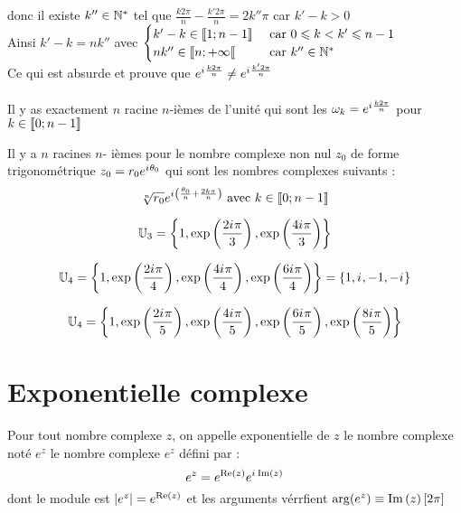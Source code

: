 \begin{dem}
    donc il existe \(k'' \in \mathbb{N}^*\) tel que \(\frac{k2\pi}{n} -\frac{k'2\pi}{n} = 2 k'' \pi\) car \(k'-k >0\)\\
    Ainsi \(k'-k = nk''\) avec \(\begin{cases}
        k'-k \in \left\llbracket1;n-1\right\rrbracket &\text{ car } 0\leqslant k<k'\leqslant n-1 \\
        nk'' \in \left\llbracket n;+\infty\right\llbracket & \text{ car } k''\in \mathbb{N}^*
    \end{cases}\) \\
    Ce qui est absurde et prouve que \(e^{i\mkern1mu \frac{k2\pi}{n}} \neq e^{i\mkern1mu \frac{k'2\pi}{n}}\)\\
    \conclusion \\
    Il y as exactement \(n\) racine \(n\)-ièmes de l'unité qui sont les \( \omega_k = e^{i\mkern1mu \frac{k2\pi}{n}}\) pour \(k\in \left\llbracket0;n-1\right\rrbracket\)
\end{dem}


\begin{defprop}
    Il y a \(n\) racines \(n\)- ièmes pour le nombre complexe non nul \(z_0\) de forme trigonométrique \(z_0 = r_0e^{i\mkern1mu\theta_0}\) qui sont les nombres complexes suivants :
    \[\sqrt[n]{r_0}e^{i\mkern1mu \left(\frac{\theta_0}{n}+\frac{2k\pi}{n}\right)} \text{ avec }k \in \left\llbracket0;n-1\right\rrbracket\]
\end{defprop}

\begin{ex}
\[\mathbb{U}_3 = \left\lbrace1,\exp\left(\frac{2i\mkern1mu \pi}{3}\right),\exp \left(\frac{4 i\mkern1mu \pi}{3}\right)\right\rbrace\]

\[\mathbb{U}_4 = \left\lbrace1,\exp\left(\frac{2i\mkern1mu \pi}{4}\right),\exp \left(\frac{4 i\mkern1mu \pi}{4}\right),\exp \left(\frac{6 i\mkern1mu \pi}{4}\right)\right\rbrace = \left\lbrace1,i\mkern1mu,-1,-i\mkern1mu\right\rbrace\]

\[\mathbb{U}_4 = \left\lbrace1,\exp\left(\frac{2i\mkern1mu \pi}{5}\right),\exp \left(\frac{4 i\mkern1mu \pi}{5}\right),\exp \left(\frac{6 i\mkern1mu \pi}{5}\right),\exp \left(\frac{8i\mkern1mu \pi}{5}\right)\right\rbrace \]

\end{ex}

\section{Exponentielle complexe}
\begin{defi}
Pour tout nombre complexe \(z\), on appelle exponentielle de \(z\) le nombre complexe noté \(e^z\) le nombre complexe \(e^z\) défini par : 
\[e^z = e^{\operatorname{Re}\left(z\right)}e^{i\mkern1mu \operatorname{Im}\left(z\right)}\]
dont le module est \(\left\lvert e^z\right\rvert = e^{\operatorname{Re}\left(z\right)}\) et les arguments vérrfient \(\arg(e^z)\equiv \operatorname{Im}\left(z\right) [2\pi]\)
\end{defi}

